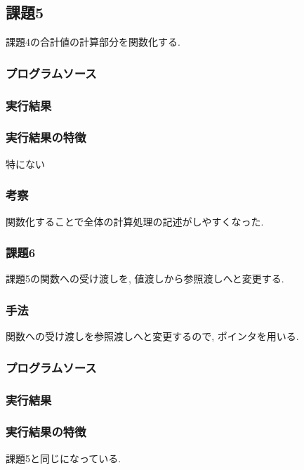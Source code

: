 \documentclass{jsarticle}
\begin{document}
        \subsection{課題5}
            課題4の合計値の計算部分を関数化する.
            \subsubsection{プログラムソース}
                
            
            \subsubsection{実行結果}
                
            
            \subsubsection{実行結果の特徴}
                特にない
            
            \subsubsection{考察}
                関数化することで全体の計算処理の記述がしやすくなった. 

        \subsubsection{課題6}
            課題5の関数への受け渡しを, 値渡しから参照渡しへと変更する. 
            \subsubsection{手法}
                関数への受け渡しを参照渡しへと変更するので, ポインタを用いる. 
            \subsubsection{プログラムソース}
                
            \subsubsection{実行結果}
                
            \subsubsection{実行結果の特徴}
                課題5と同じになっている. 
\end{document}
